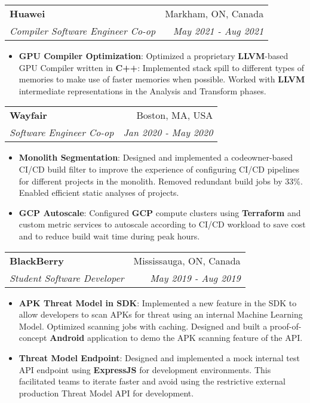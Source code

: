 \documentclass[letterpaper,11pt]{article}
\makeatletter
\newcommand{\resumeItem}[2]{
  \item\small{
    \textbf{#1}{: #2 \vspace{-2pt}}
  }
}
\newcommand{\resumeSubheading}[4]{
  \vspace{-1pt}\item
    \begin{tabular*}{0.97\textwidth}[t]{l@{\extracolsep{\fill}}r}
      \textbf{#1} & #2 \\
      \textit{\small#3} & \textit{\small #4} \\
    \end{tabular*}\vspace{-5pt}
}
\newcommand{\resumeSubSubheading}[2]{
    \begin{tabular*}{0.97\textwidth}{l@{\extracolsep{\fill}}r}
      \textit{\small#1} & \textit{\small #2} \\
    \end{tabular*}\vspace{-5pt}
}
\newcommand{\resumeSubHeadingListEnd}{\end{itemize}}
\newcommand{\resumeItemListStart}{\begin{itemize}}
\newcommand{\resumeItemListEnd}{\end{itemize}\vspace{-5pt}}
\makeatother
\begin{document}

    \resumeSubheading
      {Huawei}{Markham, ON, Canada}
      {Compiler Software Engineer Co-op}{May 2021 - Aug 2021}
      \resumeItemListStart
        \resumeItem{GPU Compiler Optimization}
          {Optimized a proprietary \textbf{LLVM}-based GPU Compiler written in \textbf{C++}: Implemented stack spill to different types of memories to make use of faster memories when possible. 
          Worked with \textbf{LLVM} intermediate representations in the Analysis and Transform phases.}
      \resumeItemListEnd

    \resumeSubheading
      {Wayfair}{Boston, MA, USA}
      {Software Engineer Co-op}{Jan 2020 - May 2020}
      \resumeItemListStart
        \resumeItem{Monolith Segmentation}
          {Designed and implemented a codeowner-based CI/CD build filter to improve the experience of configuring CI/CD pipelines for different projects in the monolith. 
          Removed redundant build jobs by 33\%.
          Enabled efficient static analyses of projects. }
        \resumeItem{GCP Autoscale}
        {Configured \textbf{GCP} compute clusters using \textbf{Terraform} and custom metric services to autoscale according to CI/CD workload to save cost and to reduce build wait time during peak hours.}
      \resumeItemListEnd

    \resumeSubheading
      {BlackBerry}{Mississauga, ON, Canada}
      {Student Software Developer}{May 2019 - Aug 2019}
      \resumeItemListStart
        \resumeItem{APK Threat Model in SDK}
          {Implemented a new feature in the SDK to allow developers to scan APKs for threat using an internal Machine Learning Model.
          Optimized scanning jobs with caching.
          Designed and built a proof-of-concept \textbf{Android} application to demo the APK scanning feature of the API. }
        \resumeItem{Threat Model Endpoint}
          {Designed and implemented a mock internal test API endpoint using \textbf{ExpressJS} for development environments. 
          This facilitated teams to iterate faster and avoid using the restrictive external production Threat Model API for development. }
      \resumeItemListEnd
\end{document}
